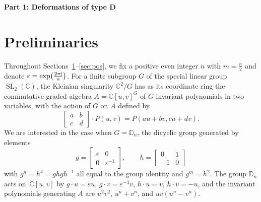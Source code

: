 \documentclass[pdftex]{sigma}
\newcommand\CC{\mathbb{C}}
\newcommand\DD{\mathbb{D}}
\DeclareMathOperator\SL{SL}
\newcommand\rn{\frac{2\pi {\rm i}}{n}}
\newcommand\acts{\cdot}
\newcommand\eps{\varepsilon}
\numberwithin{equation}{section}
\theoremstyle{definition}
\begin{document}

\begin{center}
 {\huge \bf Part 1: Deformations of type $\boldsymbol{D}$}
\end{center}

\section{Preliminaries}
\label{sec:prelim}

Throughout Sections~\ref{sec:prelim}--\ref{sec:pos},
we fix a positive even integer $n$ with $m = \frac{n}{2}$
and denote $\eps = \exp\bigl(\rn\bigr)$.
For a finite subgroup $G$
of the special linear group $\SL_2(\CC)$,
the Kleinian singularity $\CC^2 / G$
has as its coordinate ring
the commutative graded algebra $A = \CC[u, v]^G$
of $G$-invariant polynomials in two variables,
with the action of $G$ on $A$ defined by
\begin{equation*}
 \begin{bmatrix}
 a & b \\
 c & d
 \end{bmatrix}
 \cdot P(u, v) = P(au + bv, cu + dv).
\end{equation*}
We are interested in the case when $G = \DD_n$,
the dicyclic group generated by elements
\begin{equation*}
 g = \begin{bmatrix}
 \eps & 0 \\
 0 & \eps^{-1}
 \end{bmatrix}, \qquad
 h = \begin{bmatrix}
 0 & 1 \\
 -1 & 0
 \end{bmatrix}
\end{equation*}
with $g^n = h^4 = ghgh^{-1}$
all equal to the group identity
and $g^m = h^2$.
The group $\DD_n$ acts on~$\CC[u, v]$ by
$g \acts u = \eps u$, $g \acts v = \eps^{-1} v$,
$h \acts u = v$, $h \acts v = -u$,
and the invariant polynomials generating $A$
are $u^2 v^2$, $u^n + v^n$, and $uv(u^n - v^n)$.
\end{document}
